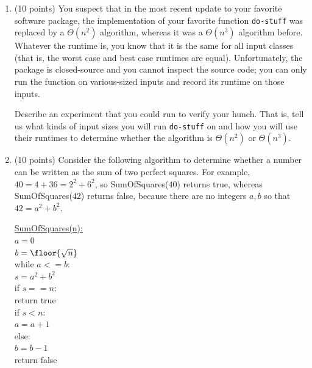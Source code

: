 \documentclass[11pt]{article}
\begin{document}
\begin{enumerate}
\begin{enumerate}[A.]
    \item $n$
    \item $\log n$
    \item $n^2$
    \item $n^3$
    \item $n!$
\end{enumerate}



\subsection*{Handwritten}
\item (10 points)
You suspect that in the most recent update to your favorite software package,
the implementation of your favorite function \texttt{do-stuff} was replaced by a $\Theta(n^2)$ 
algorithm, whereas it was a $\Theta(n^3)$ algorithm before. Whatever the runtime is, you know that
it is the same for all input classes (that is, the worst case and best case runtimes are equal).
Unfortunately, the package is
closed-source and you cannot inspect the source code; you can only run the function on
various-sized inputs and record its runtime on those inputs.

Describe an experiment that you could run to verify your hunch. That is, tell us what kinds
of input sizes you will run \texttt{do-stuff} on and how you will use their runtimes to
determine whether the algorithm is $\Theta(n^2)$ or $\Theta(n^3)$.

\item (10 points) Consider the following algorithm to determine whether a number can be written
as the sum of two perfect squares. For example, $40=4+36=2^2+6^2$, so SumOfSquares($40$) returns
true, whereas SumOfSquares($42$) returns false, because there are no integers $a,b$ so that
$42=a^2 + b^2$.

    \begin{algo}
    \underline{SumOfSquares(n):}\+\\
    $a = 0$\\
    $b = \floor{\sqrt{n}}$\\
    while $a <= b$:\+\\
        $s = a^2 + b^2$\\
        if $s == n$:\+\\
            return true\-\\
        if $s < n$:\+\\
            $a = a + 1$\-\\
        else:\+\\
            $b = b - 1$\-\-\\
    return false\\
    \end{algo}


\end{enumerate}
\end{document}
